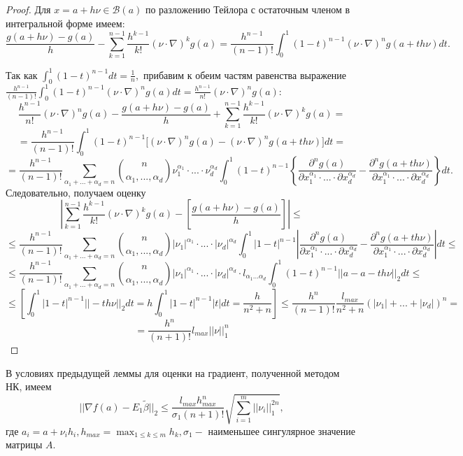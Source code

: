 \documentclass[12 pt, russian]{article}
\begin{document}
\begin{proof}
    Для $x = a+h\nu \in \mathcal{B}(a)$ по разложению Тейлора с остаточным членом в интегральной форме имеем:
    $$ \frac{g(a+h\nu) - g(a)}{h} - \sum_{k=1}^{n-1}\frac{h^{k-1}}{k!}(\nu \cdot \nabla)^k g(a) = \frac{h^{n-1}}{(n-1)!}\int_0^1(1-t)^{n-1}(\nu \cdot \nabla)^n g(a + th\nu)dt. $$

    Так как $\int_0^1 (1-t)^{n-1}dt = \frac{1}{n},$ прибавим к обеим частям равенства выражение $\frac{h^{n-1}}{(n-1)!}\int_0^1(1-t)^{n-1}(\nu \cdot \nabla)^n g(a) dt = \frac{h^{n-1}}{n!}(\nu \cdot \nabla)^n g(a):$
    $$ \frac{h^{n-1}}{n!}(\nu \cdot \nabla)^n g(a) - \frac{g(a+h\nu) - g(a)}{h} + \sum_{k=1}^{n-1}\frac{h^{k-1}}{k!}(\nu \cdot \nabla)^k g(a) = $$
    $$ = \frac{h^{n-1}}{(n-1)!}\int_0^1(1-t)^{n-1} \Big[ (\nu \cdot \nabla)^n g(a) - (\nu \cdot \nabla)^n g(a + th\nu) \Big] dt = $$
    $$= \frac{h^{n-1}}{(n-1)!} \sum_{\alpha_1 + ... + \alpha_d = n}\binom{n}{\alpha_1, ..., \alpha_d}\nu_1^{\alpha_1}\cdot...\cdot\nu_d^{\alpha_d}\int_0^1(1-t)^{n-1} \left\{ \frac{\partial^ng(a)}{\partial x_1^{\alpha_1}\cdot...\cdot\partial x_d^{\alpha_d}} -  \frac{\partial^ng(a+th\nu)}{\partial x_1^{\alpha_1}\cdot...\cdot\partial x_d^{\alpha_d}}\right\}dt. $$
    Следовательно, получаем оценку
    $$ \left|\sum_{k=1}^{n-1}\frac{h^{k-1}}{k!}(\nu \cdot \nabla)^k g(a) - \left[ \frac{g(a + h\nu) - g(a)}{h} \right] \right| \leq $$
    $$ \leq \frac{h^{n-1}}{(n-1)!} \sum_{\alpha_1 + ... + \alpha_d = n}\binom{n}{\alpha_1, ..., \alpha_d}|\nu_1|^{\alpha_1}\cdot...\cdot|\nu_d|^{\alpha_d}\int_0^1|1-t|^{n-1} \left| \frac{\partial^ng(a)}{\partial x_1^{\alpha_1}\cdot...\cdot\partial x_d^{\alpha_d}} -  \frac{\partial^ng(a+th\nu)}{\partial x_1^{\alpha_1}\cdot...\cdot\partial x_d^{\alpha_d}}\right|dt \leq $$
    $$ \leq \frac{h^{n-1}}{(n-1)!} \sum_{\alpha_1 + ... + \alpha_d = n}\binom{n}{\alpha_1, ..., \alpha_d}|\nu_1|^{\alpha_1}\cdot...\cdot|\nu_d|^{\alpha_d}\cdot l_{\alpha_1...\alpha_d} \int_0^1(1-t)^{n-1} || a -a -th\nu||_2dt \leq $$
    $$ \leq \left[ \int_0^1|1-t|^{n-1}||-th\nu||_2dt = h\int_0^1|1-t|^{n-1}|t|dt = \frac{h}{n^2 + n}\right] \leq \frac{h^n}{(n-1)!}\frac{l_{max}}{n^2 + n}(|\nu_1| + ... + |\nu_d|)^n = $$
    $$= \frac{h^n}{(n+1)!}l_{max}||\nu||_1^n $$
    
\end{proof}


\begin{Thm}
В условиях предыдущей леммы для оценки на градиент, полученной методом НК, имеем
$$ ||\nabla f(a) - E_1\tilde{\beta}||_2 \leq \frac{l_{max}h^n_{max}}{\sigma_1(n+1)!}\sqrt{\sum_{i=1}^m||\nu_i||_1^{2n}}, $$
где $a_i = a + \nu_i h_i, h_{max} = \max_{1\leq k \leq m}h_k, \sigma_1 - $ наименьшее сингулярное значение матрицы $A.$
\end{Thm}
\end{document}
